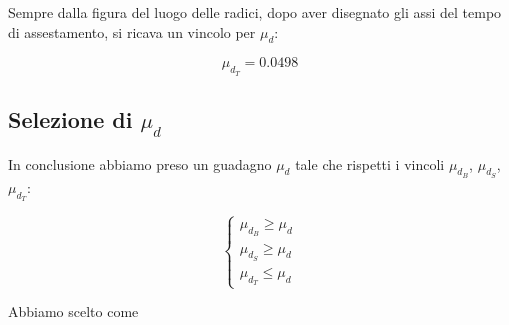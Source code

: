 \documentclass{article}
\begin{document}
Sempre dalla figura del luogo delle radici, dopo aver disegnato gli assi del tempo di assestamento, si ricava un vincolo per $\mu_d$:

$$
    \mu_{d_T} = 0.0498
$$

\subsection{Selezione di $\mu_d$}

In conclusione abbiamo preso un guadagno $\mu_d$ tale che rispetti i vincoli $\mu_{d_B}$, $\mu_{d_S}$, $\mu_{d_T}$:

$$
\begin{cases}
    \mu_{d_B}\geq\mu_d\\
    \mu_{d_S}\geq\mu_d\\
    \mu_{d_T}\leq\mu_d
\end{cases}
$$

Abbiamo scelto come 
\end{document}
